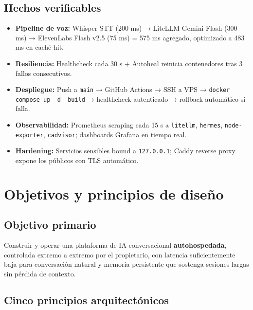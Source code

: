 \documentclass[11pt,a4paper]{article}
\newcommand{\dato}[2]{\textbf{\color{hermesblue}#1:} #2}
\begin{document}
\subsection{Hechos verificables}

\begin{itemize}[leftmargin=*,itemsep=2pt]
\item \dato{Pipeline de voz}{Whisper STT (200 ms) → LiteLLM Gemini Flash (300 ms) → ElevenLabs Flash v2.5 (75 ms) = 575 ms agregado, optimizado a 483 ms en caché-hit.}
\item \dato{Resiliencia}{Healthcheck cada 30 s + Autoheal reinicia contenedores tras 3 fallos consecutivos.}
\item \dato{Despliegue}{Push a \texttt{main} → GitHub Actions → SSH a VPS → \texttt{docker compose up -d --build} → healthcheck autenticado → rollback automático si falla.}
\item \dato{Observabilidad}{Prometheus scraping cada 15 s a \texttt{litellm}, \texttt{hermes}, \texttt{node-exporter}, \texttt{cadvisor}; dashboards Grafana en tiempo real.}
\item \dato{Hardening}{Servicios sensibles bound a \texttt{127.0.0.1}; Caddy reverse proxy expone los públicos con TLS automático.}
\end{itemize}

\newpage

\section{Objetivos y principios de diseño}

\subsection{Objetivo primario}

Construir y operar una plataforma de IA conversacional \textbf{autohospedada}, controlada extremo a extremo por el propietario, con latencia suficientemente baja para conversación natural y memoria persistente que sostenga sesiones largas sin pérdida de contexto.

\subsection{Cinco principios arquitectónicos}
\end{document}
